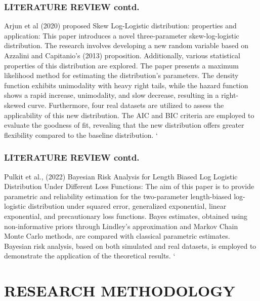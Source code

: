 \documentclass{beamer}
\begin{document}
\begin{frame}
		\frametitle{\textbf{LITERATURE REVIEW contd.}}
  \renewcommand{\arraystretch}{1.5}
	Arjun et al (2020) proposed Skew Log-Logistic distribution: properties
and application: This paper introduces a novel three-parameter skew-log-logistic distribution. The research involves developing a new random variable based on Azzalini and Capitanio’s (2013) proposition. Additionally, various statistical properties of this distribution are explored. The paper presents a maximum likelihood method for estimating the distribution’s parameters. The density function exhibits unimodality with heavy right tails, while the hazard function shows a rapid increase, unimodality, and slow decrease, resulting in a right-skewed curve. Furthermore, four real datasets are utilized to assess the applicability of this new distribution. The AIC and BIC criteria are employed to evaluate the goodness of fit, revealing that the new distribution offers greater flexibility compared to the baseline distribution.
`	\end{frame}



\begin{frame}
		\frametitle{\textbf{LITERATURE REVIEW contd.}}
  \renewcommand{\arraystretch}{1.5}
	Pulkit et al., (2022) Bayesian Risk Analysis for Length Biased Log
Logistic Distribution Under Different Loss
Functions: The aim of this paper is to provide parametric and reliability estimation for the two-parameter length-biased log-logistic distribution under squared error, generalized exponential, linear exponential, and precautionary loss functions. Bayes estimates, obtained using non-informative priors through Lindley's approximation and Markov Chain Monte Carlo methods, are compared with classical parametric estimates. Bayesian risk analysis, based on both simulated and real datasets, is employed to demonstrate the application of the theoretical results.
`	\end{frame}




\section{RESEARCH METHODOLOGY}
\end{document}
